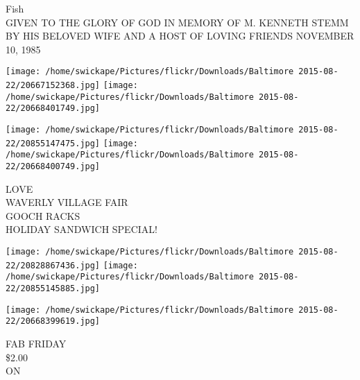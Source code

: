 \documentclass[10pt,letterpaper]{article}
\begin{document}
Fish\\
GIVEN TO THE GLORY OF GOD IN MEMORY OF M. KENNETH STEMM BY HIS BELOVED WIFE AND A HOST OF LOVING FRIENDS NOVEMBER 10, 1985
\pagebreak

\texttt{[image: /home/swickape/Pictures/flickr/Downloads/Baltimore 2015-08-22/20667152368.jpg]}
\texttt{[image: /home/swickape/Pictures/flickr/Downloads/Baltimore 2015-08-22/20668401749.jpg]}

\texttt{[image: /home/swickape/Pictures/flickr/Downloads/Baltimore 2015-08-22/20855147475.jpg]}
\texttt{[image: /home/swickape/Pictures/flickr/Downloads/Baltimore 2015-08-22/20668400749.jpg]}

LOVE\\
WAVERLY VILLAGE FAIR\\
GOOCH RACKS\\
HOLIDAY SANDWICH SPECIAL!
\pagebreak

\texttt{[image: /home/swickape/Pictures/flickr/Downloads/Baltimore 2015-08-22/20828867436.jpg]}
\texttt{[image: /home/swickape/Pictures/flickr/Downloads/Baltimore 2015-08-22/20855145885.jpg]}

\texttt{[image: /home/swickape/Pictures/flickr/Downloads/Baltimore 2015-08-22/20668399619.jpg]}

FAB FRIDAY\\
\$2.00\\
ON
\pagebreak
\end{document}
